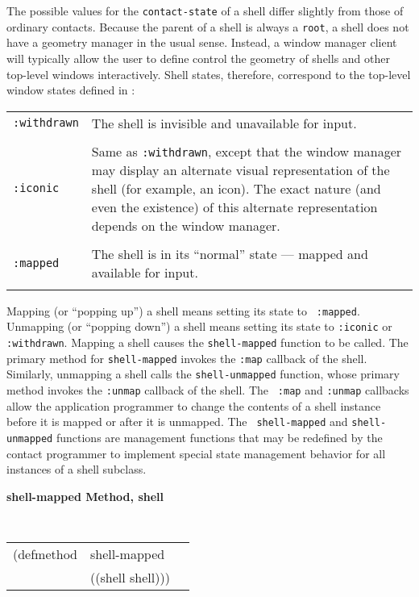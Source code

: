 \documentclass[twoside]{book}
\begin{document}
\begin{sloppy}
The possible values for the {\tt contact-state} of a shell
differ slightly from those of ordinary contacts. Because the parent of a
shell is always a {\tt root}, a shell does not have a geometry manager
in the usual sense. Instead, a window manager client will typically allow the  user to define control the geometry
of shells and other top-level windows interactively. Shell states,
therefore, correspond to the top-level window states defined in
\cite{icccm}:

\begin{center}
\begin{tabular}{lp{3.5in}}
{\tt :withdrawn} & The shell is invisible and unavailable for input.\\
\\ 
{\tt :iconic} & Same as {\tt :withdrawn}, except that the window manager
may display an alternate visual representation of the shell (for
example, an icon). The exact nature (and even the existence) of this
alternate representation depends on the window manager.\\
\\ {\tt :mapped} & The shell is in its ``normal'' state --- mapped and
available for input.\\ \\ 
\end{tabular} \end{center}


Mapping (or ``popping up'') a shell means setting its state to {\tt
:mapped}.
Unmapping (or ``popping down'') a shell means setting its state to {\tt :iconic} or {\tt
:withdrawn}. Mapping a shell causes the {\tt shell-mapped} function to be called.
The primary method for {\tt shell-mapped} invokes the {\tt :map} callback of the
shell. Similarly, unmapping a shell calls the {\tt shell-unmapped} function,
whose primary method invokes the {\tt :unmap} callback of the shell. The {\tt
:map} and {\tt :unmap} callbacks allow the application programmer to change the
contents of a shell instance before it is mapped or after it is unmapped. The {\tt
shell-mapped} and {\tt shell-unmapped} functions are management functions that may
be redefined by the contact programmer  to implement special state management
behavior for all instances of a shell subclass.

{\samepage
{\large {\bf shell-mapped \hfill Method, shell}}
\begin{flushright} \parbox[t]{6.125in}{
\tt
\begin{tabular}{lll}
\raggedright
(defmethod & shell-mapped & \\
           & ((shell  shell)))
\end{tabular}
\rm

}
\end{flushright}}
\end{sloppy}
\end{document}
